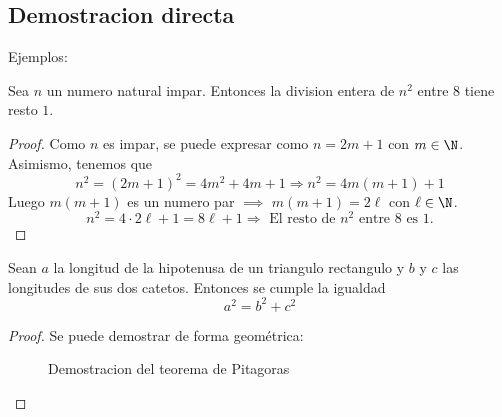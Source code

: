 \subsection*{Demostracion directa}
\noindent Ejemplos:
\begin{proposition}
	Sea \(n \) un numero natural impar. Entonces la division entera de \( n^{2} \) entre \(8 \) tiene resto \(1\).
\end{proposition}
\begin{proof}
	Como \(n \) es impar, se puede expresar como \(n = 2m + 1 \) con \(m \in  \N \). Asimismo, tenemos que
	\[
		n^{2} = (2m+1)^{2} = 4m^{2} + 4m + 1 \Rightarrow n^{2} = 4m(m + 1) + 1
	\]
	Luego \(m(m+1)\) es un numero par \(\implies \) \(m(m+1 ) = 2 \ell \) con \(\ell \in  \N \).
	\[
		n^{2} = 4 \cdot 2\ell + 1 = 8\ell + 1 \Rightarrow \text{ El resto de \(n^{2}\) entre 8 es 1.}
	\]

\end{proof}

\begin{theorem}[de Pitagoras]
	Sean \(a \) la longitud de la hipotenusa de un triangulo rectangulo y \(b \) y \(c \) las longitudes de sus dos catetos. Entonces se cumple la igualdad
	\[
		a^{2} = b^{2}+c^{2}
	\]
\end{theorem}
\begin{proof}
	Se puede demostrar de forma geométrica:
	\begin{figure}[H]
		\centering
		\caption{Demostracion del teorema de Pitagoras}
		\label{fig:pitagoras}
	\end{figure}
\end{proof}

